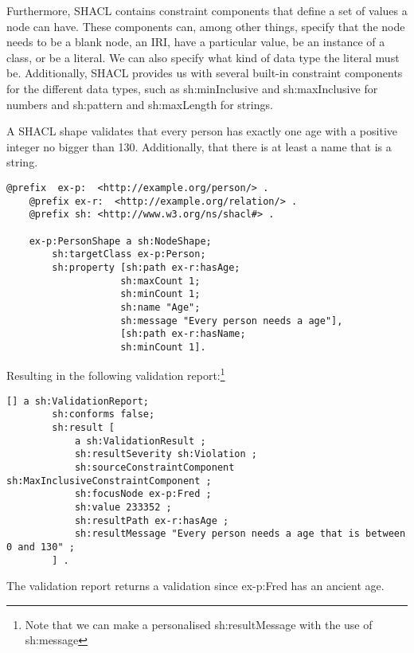 \para
Furthermore, SHACL contains constraint components that define a set of values a node can have. These components can, among other things, specify that the node needs to be a blank node, an IRI, have a particular value, be an instance of a class, or be a literal. We can also specify what kind of data type the literal must be. Additionally, SHACL provides us with several built-in constraint components for the different data types, such as sh:minInclusive and sh:maxInclusive for numbers and  sh:pattern and sh:maxLength for strings.

\begin{example}
A SHACL shape validates that every person has exactly one age with a positive integer no bigger than 130.  Additionally,  that there is at least a name that is a string.
\end{example}

\begin{lstlisting}[frame=single, language=turtle, frame=none]
    @prefix  ex-p:  <http://example.org/person/> . 
    @prefix ex-r:  <http://example.org/relation/> . 
    @prefix sh:	<http://www.w3.org/ns/shacl#> .

    ex-p:PersonShape a sh:NodeShape;
        sh:targetClass ex-p:Person;
        sh:property [sh:path ex-r:hasAge; 
                    sh:maxCount 1;
                    sh:minCount 1;
                    sh:name "Age";
                    sh:message "Every person needs a age"],
                    [sh:path ex-r:hasName;
                    sh:minCount 1].
\end{lstlisting}
Resulting in the following validation report:\footnote{Note that we can make a personalised sh:resultMessage with the use of sh:message}
\begin{lstlisting}[frame=single, language=turtle, frame=none]
    [] a sh:ValidationReport;
        sh:conforms false;
        sh:result [
            a sh:ValidationResult ;
            sh:resultSeverity sh:Violation ;
            sh:sourceConstraintComponent sh:MaxInclusiveConstraintComponent ;
            sh:focusNode ex-p:Fred ;
            sh:value 233352 ;
            sh:resultPath ex-r:hasAge ;
            sh:resultMessage "Every person needs a age that is between 0 and 130" ;
        ] .        
\end{lstlisting}
The validation report returns a validation since ex-p:Fred has an ancient age.

